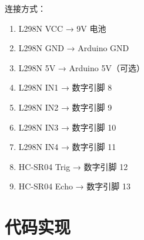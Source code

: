 \documentclass[12pt,UTF8]{ctexbook}
\begin{document}
连接方式：
\begin{enumerate}
    \item L298N VCC → 9V 电池
    \item L298N GND → Arduino GND
    \item L298N 5V → Arduino 5V（可选）
    \item L298N IN1 → 数字引脚 8
    \item L298N IN2 → 数字引脚 9
    \item L298N IN3 → 数字引脚 10
    \item L298N IN4 → 数字引脚 11
    \item HC-SR04 Trig → 数字引脚 12
    \item HC-SR04 Echo → 数字引脚 13
\end{enumerate}

\section{代码实现}
\end{document}
